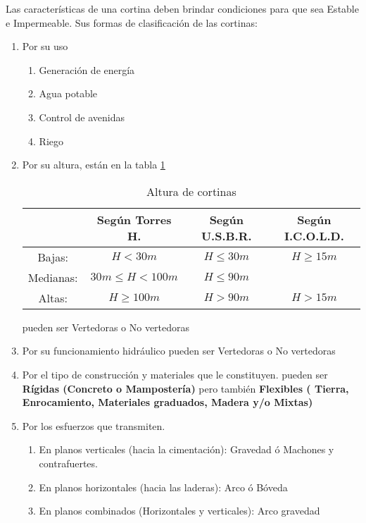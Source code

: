 Las características de una cortina deben brindar condiciones para que sea
Estable e Impermeable. Sus formas de clasificación de las cortinas:
\begin{enumerate}
	\item Por su uso
	      \begin{enumerate}
		      \item Generación de energía
		      \item Agua potable
		      \item Control de avenidas
		      \item Riego
	      \end{enumerate}
	\item Por su altura, están en la tabla \ref{tab17}
	      \begin{table}[h!]
		      \centering
		      \begin{tabular}{|c|c|c|c|}
			      \hline
			                & Según Torres H.        & Según U.S.B.R. & Según I.C.O.L.D. \\ \hline
			      Bajas:    & $H < 30 m$             & $H \leq 30 m$  & $H \geq 15 m$    \\ \hline
			      Medianas: & $30 m  \leq H < 100 m$ & $H \leq 90 m$  &                  \\ \hline
			      Altas:    & $H \geq 100 m$         & $H > 90 m$     & $H > 15 m$       \\ \hline
		      \end{tabular}
		      \caption{Altura de cortinas}
		      \label{tab17}
	      \end{table}
	      pueden ser Vertedoras o No vertedoras
	\item Por su funcionamiento hidráulico
	      pueden ser Vertedoras o No vertedoras
	\item Por el tipo de construcción y materiales que le constituyen.
	      pueden ser \textbf{Rígidas (Concreto
		      o Mampostería)} pero también \textbf{Flexibles ( Tierra, Enrocamiento, Materiales graduados, Madera y/o Mixtas)}
	\item Por los esfuerzos que transmiten.
	      \begin{enumerate}
		      \item En planos verticales (hacia la cimentación): Gravedad ó Machones y contrafuertes.
		      \item En planos horizontales (hacia las laderas): Arco ó Bóveda
		      \item En planos combinados (Horizontales y verticales): Arco gravedad
	      \end{enumerate}
\end{enumerate}

